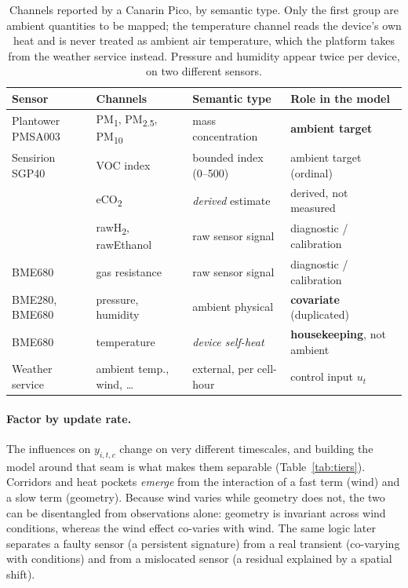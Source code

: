 \documentclass[10pt]{article}
\begin{document}
\begin{table}[t]
\centering
\small
\begin{tabular}{@{}llll@{}}
\toprule
Sensor & Channels & Semantic type & Role in the model \\
\midrule
Plantower PMSA003 & PM\textsubscript{1}, PM\textsubscript{2.5}, PM\textsubscript{10}
 & mass concentration & \textbf{ambient target} \\
Sensirion SGP40 & VOC index & bounded index (0--500) & ambient target (ordinal) \\
 & eCO\textsubscript{2} & \emph{derived} estimate & derived, not measured \\
 & rawH\textsubscript{2}, rawEthanol & raw sensor signal & diagnostic / calibration \\
BME680 & gas resistance & raw sensor signal & diagnostic / calibration \\
BME280, BME680 & pressure, humidity & ambient physical & \textbf{covariate} (duplicated) \\
BME680 & temperature & \emph{device self-heat} & \textbf{housekeeping}, not ambient \\
\midrule
Weather service & ambient temp., wind, \dots & external, per cell-hour & control input $u_t$ \\
\bottomrule
\end{tabular}
\caption{Channels reported by a Canarin Pico, by semantic type. Only the first
group are ambient quantities to be mapped; the temperature channel reads the
device's own heat and is never treated as ambient air temperature, which the
platform takes from the weather service instead. Pressure and humidity appear
twice per device, on two different sensors.}
\label{tab:channels}
\end{table}

\paragraph{Factor by update rate.}
The influences on $y_{i,t,c}$ change on very different timescales, and building the
model around that seam is what makes them separable (Table~\ref{tab:tiers}).
Corridors and heat pockets \emph{emerge} from the interaction of a fast term
(wind) and a slow term (geometry). Because wind varies while geometry does not,
the two can be disentangled from observations alone: geometry is invariant across
wind conditions, whereas the wind effect co-varies with wind. The same logic
later separates a faulty sensor (a persistent signature) from a real transient
(co-varying with conditions) and from a mislocated sensor (a residual explained by
a spatial shift).
\end{document}
